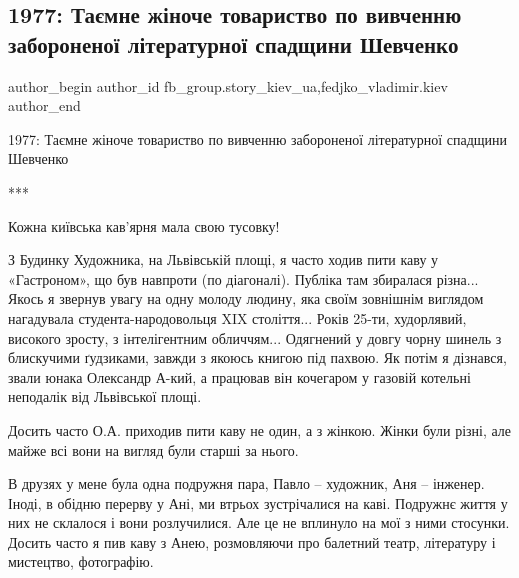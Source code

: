  
 
 
 
 
 
\subsection{1977: Таємне жіноче товариство по вивченню забороненої літературної спадщини Шевченко}
\label{sec:20_11_2021.fb.fb_group.story_kiev_ua.3.1977_nasledie_shevchenko}
 
\ifcmt
 author_begin
   author_id fb_group.story_kiev_ua,fedjko_vladimir.kiev
 author_end
\fi

1977: Таємне жіноче товариство по вивченню забороненої літературної спадщини Шевченко

***

Кожна київська кав’ярня мала свою тусовку! 

З Будинку Художника, на Львівській площі, я часто ходив пити каву у
«Гастроном», що був навпроти (по діагоналі). Публіка там збиралася різна... Якось
я звернув увагу на одну молоду людину, яка своїм зовнішнім виглядом нагадувала
студента-народовольця XIX століття... Років 25-ти, худорлявий, високого зросту, з
інтелігентним обличчям... Одягнений у довгу чорну шинель з блискучими ґудзиками,
завжди з якоюсь книгою під пахвою. Як потім я дізнався, звали юнака Олександр
А-кий, а працював він кочегаром у газовій котельні неподалік від Львівської
площі. 


Досить часто О.А. приходив пити каву не один, а з жінкою. Жінки були різні, але
майже всі вони на вигляд були старші за нього. 

В друзях у мене була одна подружня пара, Павло – художник, Аня – інженер.
Іноді, в обідню перерву у Ані, ми втрьох зустрічалися на каві. Подружнє життя у
них не склалося і вони розлучилися. Але це не вплинуло на мої з ними стосунки.
Досить часто я пив каву з Анею, розмовляючи про балетний театр, літературу і
мистецтво, фотографію. 

